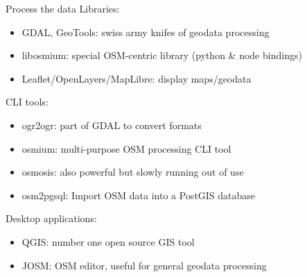 \documentclass{beamer}
\begin{document}
		\begin{frame}{Process the data}
			Libraries:
			\begin{itemize}
				\item GDAL, GeoTools: swiss army knifes of geodata processing
				\item libosmium: special OSM-centric library (python \& node bindings)
				\item Leaflet/OpenLayers/MapLibre: display maps/geodata
			\end{itemize}
			\pause
			CLI tools:
			\begin{itemize}
				\item ogr2ogr: part of GDAL to convert formats
				\item osmium: multi-purpose OSM processing CLI tool
				\item osmosis: also powerful but slowly running out of use
				\item osm2pgsql: Import OSM data into a PostGIS database
			\end{itemize}
			\pause
			Desktop applications:
			\begin{itemize}
				\item QGIS: number one open source GIS tool
				\item JOSM: OSM editor, useful for general geodata processing
			\end{itemize}
		\end{frame}
\end{document}
